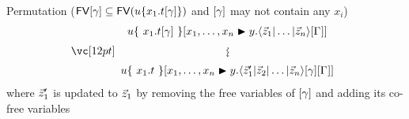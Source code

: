 \documentclass{amsart}
\begin{document}
\bigskip
\bigskip
\bigskip


\noindent
Permutation ($\FV\g\subseteq\FV(u\cxt*{x_1.t\g})$ and $\g$ may not contain any
$x_i$)
\[
\displayrewrite
  { u\cxt*{~x_1.t\g~}\diistr xy{\ttup*z\G} }
  { u\cxt*{~x_1.t~}\diistr xy{\tup*{\vv*z'_1|\vv*z_2|\dotso|\vv*z_n}\g\G} }
\]
where $\vv*z'_1$ is updated to $\vv*z_1$ by removing the free variables of $\g$ and adding its co-free variables
\end{document}
